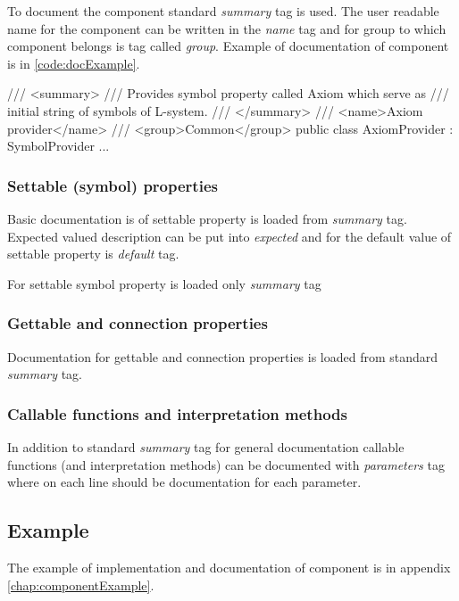 To document the component standard \emph{summary} tag is used.
The user readable name for the component can be written in the \emph{name} tag and for group to which component belongs is tag called \emph{group}.
Example of documentation of component is in \autoref{code:docExample}.

\begin{Csharp}[label=code:docExample,caption={Example of usage XmlDoc for documentation of component}]
/// <summary>
///	Provides symbol property called Axiom which serve as
/// initial string of symbols of L-system.
/// </summary>
/// <name>Axiom provider</name>
/// <group>Common</group>
public class AxiomProvider : SymbolProvider {
	...
}
\end{Csharp}



\subsubsection{Settable (symbol) properties}

Basic documentation is of settable property is loaded from \emph{summary} tag.
Expected valued description can be put into \emph{expected} and for the default value of settable property is \emph{default} tag.

For settable symbol property is loaded only \emph{summary} tag


\subsubsection{Gettable and connection properties}

Documentation for gettable  and connection properties is loaded from standard \emph{summary} tag.


\subsubsection{Callable functions and interpretation methods}

In addition to standard \emph{summary} tag for general documentation callable functions (and interpretation methods) can be documented with \emph{parameters} tag where on each line should be documentation for each parameter. 


\subsection{Example}

The example of implementation and documentation of component is in appendix \ref{chap:componentExample}.


